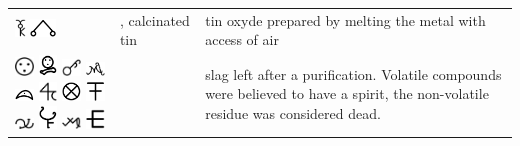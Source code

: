 \documentclass[british,final,landscape]{scrartcl}
\begin{document}
\begin{refsection}
\begin{supertabular}{p{0.3\textwidth}p{0.34\textwidth}p{0.34\textwidth}}
   \includegraphics[height=5mm]{Mixtures/CalcinatedTin} \includegraphics[height=5mm]{Mixtures/CalcinatedTin2} & , calcinated tin & tin oxyde  prepared by melting the metal with access of air \\
   \includegraphics[width=5mm]{Mixtures/CaputMortuum} \includegraphics[width=5mm]{Mixtures/CaputMortuum2} \includegraphics[width=5mm]{Mixtures/CaputMortuum3} \includegraphics[width=5mm]{Mixtures/CaputMortuum4} \includegraphics[width=5mm]{Mixtures/CaputMortuum5} \includegraphics[width=5mm]{Mixtures/CaputMortuum6} \includegraphics[width=5mm]{Mixtures/CaputMortuum7} \includegraphics[width=5mm]{Mixtures/CaputMortuum8} \includegraphics[width=5mm]{Mixtures/CaputMortuum9} \includegraphics[width=5mm]{Mixtures/CaputMortuum10} \includegraphics[width=5mm]{Mixtures/CaputMortuum11} \includegraphics[width=5mm]{Mixtures/CaputMortuum12} &  & slag left after a purification. Volatile compounds were believed to have a spirit, the non-volatile residue was considered dead. \\

\end{supertabular}
\end{refsection}
\end{document}
